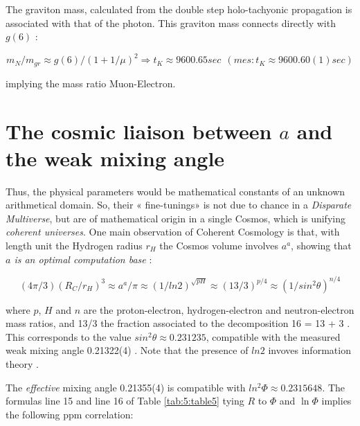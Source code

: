 \documentclass[a4paper,9pt]{article}
\begin{document}
The graviton mass, calculated from the double step holo-tachyonic propagation is associated with that of the photon. This graviton mass connects directly with $g(6)$ :

\begin{equation}
m_N/m_{gr} \approx g(6)/(1+1/\mu)^2 \Rightarrow    t_K  \approx  9600.65 sec ~~(mes : t_K \approx 9600.60(1) sec)    
\end{equation}

implying the mass ratio Muon-Electron. 





   
   
   
   
   
   
   
   
   
   

\section{The cosmic liaison between $a$ and the weak mixing angle}

Thus, the physical parameters would be mathematical constants of an unknown arithmetical domain. So, their « fine-tunings» is not due to chance in a \textit {Disparate Multiverse}, but are of mathematical origin in a single Cosmos, which is unifying \textit {coherent universes}. One main observation of Coherent Cosmology is that, with length unit the Hydrogen radius $r_H$ the Cosmos volume involves $a^a$, showing that \textit{$a$ is an optimal computation base}  \cite{Sanchez}:

\begin{equation}
    (4\pi /3) (R_C/r_H)^3 \approx a^a/\pi \approx (1/ln2)^{\sqrt{pH}} \approx (13/3)^{p/4} \approx (1/sin^2\theta)^{n/4} 
\end{equation}

where $p$, $H$ and $n$ are the proton-electron, hydrogen-electron and neutron-electron mass ratios, and 13/3 the fraction associated to the decomposition 16 = 13 + 3 \cite{Sanchez1}. This corresponds to the value $sin^2\theta \approx 0.231235$, compatible with the measured weak mixing angle 0.21322(4) \cite{Tanabashi}. Note that the presence of $ln2$ invoves information theory \cite{Shannon}. 

The \textit {effective} mixing angle 0.21355(4) \cite{Tanabashi} is compatible with $ln^2\Phi \approx 0.2315648$. The formulas line 15 and line 16 of Table \ref{tab:5:table5} tying $R$ to $\Phi$ and $\ln\Phi$ implies the following ppm correlation: 
\end{document}

